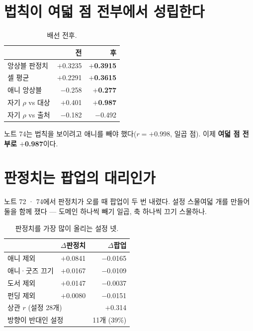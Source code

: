 \documentclass[10pt]{article}
\begin{document}
\section{법칙이 여덟 점 전부에서 성립한다}

\begin{table}[t]
\centering\tsize
\caption{배선 전후.}
\begin{tabular}{lrr}
\toprule
& 전 & 후 \\
\midrule
앙상블 판정치 & $+$0.3235 & \textbf{$+$0.3915} \\
셀 평균 & $+$0.2291 & \textbf{$+$0.3615} \\
애니 앙상블 & $-$0.258 & \textbf{$+$0.277} \\
자기 $\rho$ vs 대상 & $+$0.401 & \textbf{$+$0.987} \\
자기 $\rho$ vs 출처 & $-$0.182 & $-$0.492 \\
\bottomrule
\end{tabular}
\end{table}

노트 74는 법칙을 보이려고 애니를 빼야 했다($r{=}+0.998$, 일곱 점). 이제
\textbf{여덟 점 전부로 $+$0.987}이다.


\section{판정치는 팝업의 대리인가}

노트 72 · 74에서 판정치가 오를 때 팝업이 두 번 내렸다. 설정 스물여덟 개를
만들어 둘을 함께 쟀다 --- 도메인 하나씩 빼기 일곱, 축 하나씩 끄기 스물하나.

\begin{table}[t]
\centering\tsize
\caption{판정치를 가장 많이 올리는 설정 넷.}
\begin{tabular}{lrr}
\toprule
& $\Delta$판정치 & $\Delta$팝업 \\
\midrule
애니 제외 & $+$0.0841 & $-$0.0165 \\
애니·굿즈 끄기 & $+$0.0167 & $-$0.0109 \\
도서 제외 & $+$0.0147 & $-$0.0037 \\
펀딩 제외 & $+$0.0080 & $-$0.0151 \\
\midrule
\multicolumn{2}{l}{상관 $r$ (설정 28개)} & $+$0.314 \\
\multicolumn{2}{l}{방향이 반대인 설정} & 11개 (39\%) \\
\bottomrule
\end{tabular}
\end{table}
\end{document}
